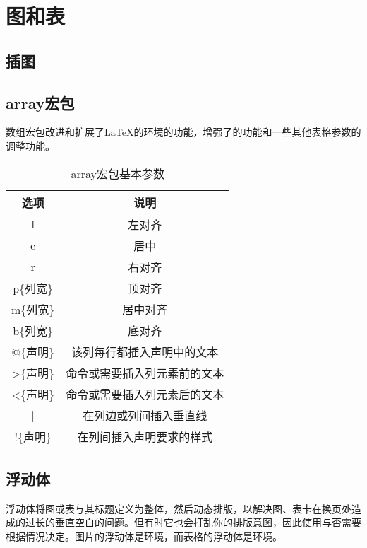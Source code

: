 {\let\clearpage\relax \chapter{图和表}}

\section{插图}

\section{array宏包}

数组宏包改进和扩展了\LaTeX 的环境的功能，增强了的功能和一些其他表格参数的调整功能。

\begin{table}[!ht]
	\caption{array宏包基本参数}
	\begin{center}
	\begin{tabular}{|c|c|}
	\hline 
	选项	&	说明 \\ 
	\hline
	l	&	左对齐 \\ 
	\hline
	c	&	居中 \\ 
	\hline
	r	&	右对齐 \\ 
	\hline
	p\{列宽\}	&	顶对齐 \\ 
	\hline
	m\{列宽\}	&	居中对齐 \\ 
	\hline
	b\{列宽\}	&	底对齐 \\ 
	\hline
	@\{声明\}	&	该列每行都插入声明中的文本 \\ 
	\hline
	>\{声明\}	&	命令或需要插入列元素前的文本 \\ 
	\hline
	<\{声明\}	&	命令或需要插入列元素后的文本 \\ 
	\hline
	|	&	在列边或列间插入垂直线 \\ 
	\hline
	!\{声明\}	&	在列间插入声明要求的样式 \\ 
	\hline
	\end{tabular}
\end{center}
\end{table}

\section{浮动体}

浮动体将图或表与其标题定义为整体，然后动态排版，以解决图、表卡在换页处造成的过长的垂直空白的问题。但有时它也会打乱你的排版意图，因此使用与否需要根据情况决定。图片的浮动体是环境，而表格的浮动体是环境。

